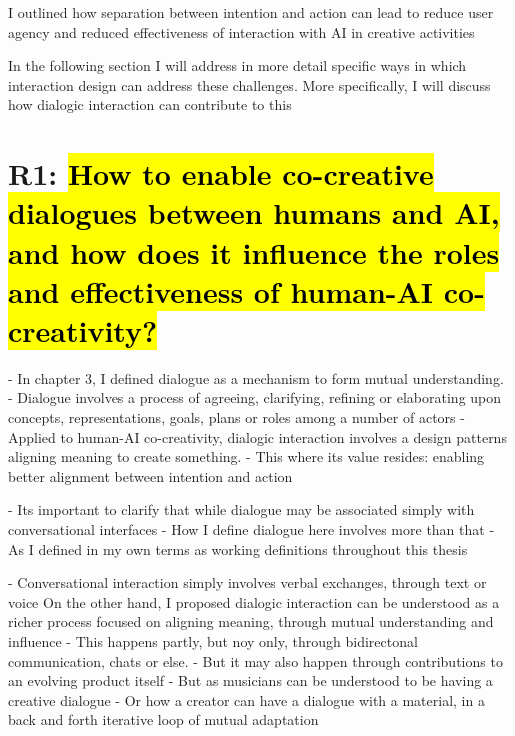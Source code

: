 I outlined how separation between intention and action can lead to reduce user agency and reduced effectiveness of interaction with AI in creative activities

In the following section I will address in more detail specific ways in which interaction design can address these challenges. 
More specifically, I will discuss how dialogic interaction can contribute to this

\section{R1: \hl{How to enable co-creative dialogues between humans and AI, and how does it influence the roles and effectiveness of human-AI co-creativity?}}


- In chapter 3, I defined dialogue as a mechanism to form mutual understanding.
- Dialogue involves a process of agreeing, clarifying, refining or elaborating upon concepts, representations, goals, plans or roles among a number of actors
- Applied to human-AI co-creativity, dialogic interaction involves a design patterns aligning meaning to create something. 
- This where its value resides: enabling better alignment between intention and action

- Its important to clarify that while dialogue may be associated simply with conversational interfaces
- How I define dialogue here involves more than that
- As I defined in my own terms as working definitions throughout this thesis

- Conversational interaction simply involves verbal exchanges, through text or voice
On the other hand, I proposed dialogic interaction can be understood as a richer process focused on aligning meaning, through mutual understanding and influence
- This happens partly, but noy only, through bidirectonal communication, chats or else. 
- But it may also happen through contributions to an evolving product itself
- But as musicians can be understood to be having a creative dialogue
- Or how a creator can have a dialogue with a material, in a back and forth iterative loop of mutual adaptation

